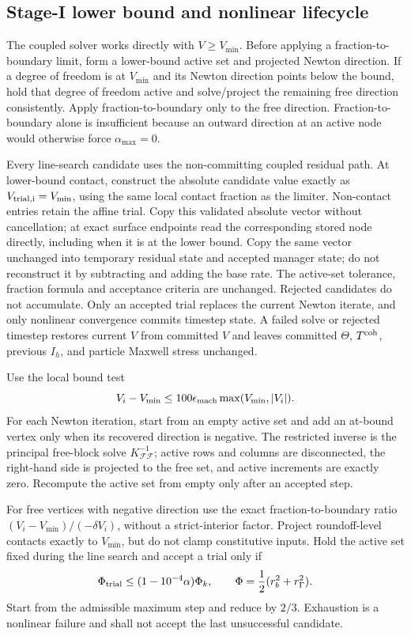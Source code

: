 \documentclass[11pt]{article}
\begin{document}
\subsection{Stage-I lower bound and nonlinear lifecycle}

The coupled solver works directly with $V\geq V_{\min}$.  Before applying a
fraction-to-boundary limit, form a lower-bound active set and projected Newton
direction.  If a degree of freedom is at $V_{\min}$ and its Newton direction
points below the bound, hold that degree of freedom active and solve/project
the remaining free direction consistently.  Apply fraction-to-boundary only
to the free direction.  Fraction-to-boundary alone is insufficient because an
outward direction at an active node would otherwise force
$\alpha_{\max}=0$.

Every line-search candidate uses the non-committing coupled residual path.
At lower-bound contact, construct the absolute candidate value exactly as
$V_{\rm trial,i}=V_{\min}$, using the same local contact fraction as the limiter.
Non-contact entries retain the affine trial. Copy this validated absolute vector
without cancellation; at exact surface endpoints read the corresponding stored
node directly, including when it is at the lower bound. Copy the same vector
unchanged into temporary residual state and accepted manager state; do not
reconstruct it by subtracting and adding the base rate. The active-set tolerance,
fraction formula and acceptance criteria are unchanged.
Rejected candidates do not accumulate.  Only an accepted trial replaces the
current Newton iterate, and only nonlinear convergence commits timestep state.
A failed solve or rejected timestep restores current $V$ from committed $V$
and leaves committed $\Theta$, $T^{\rm coh}$, previous $I_h$, and particle
Maxwell stress unchanged.

Use the local bound test
\begin{equation}
 V_i-V_{\min}\leq 100\epsilon_{\rm mach}\max(V_{\min},|V_i|).
\end{equation}
For each Newton iteration, start from an empty active set and add an at-bound
vertex only when its recovered direction is negative. The restricted inverse
is the principal free-block solve $K_{\mathcal F\mathcal F}^{-1}$; active rows
and columns are disconnected, the right-hand side is projected to the free
set, and active increments are exactly zero. Recompute the active set from
empty only after an accepted step.

For free vertices with negative direction use the exact fraction-to-boundary
ratio $(V_i-V_{\min})/(-\delta V_i)$, without a strict-interior factor. Project
roundoff-level contacts exactly to $V_{\min}$, but do not clamp constitutive
inputs. Hold the active set fixed during the line search and accept a trial
only if
\begin{equation}
 \Phi_{\rm trial}\leq (1-10^{-4}\alpha)\Phi_k,
 \qquad \Phi=\frac12(r_b^2+r_\Gamma^2).
\end{equation}
Start from the admissible maximum step and reduce by $2/3$. Exhaustion is a
nonlinear failure and shall not accept the last unsuccessful candidate.
\end{document}
